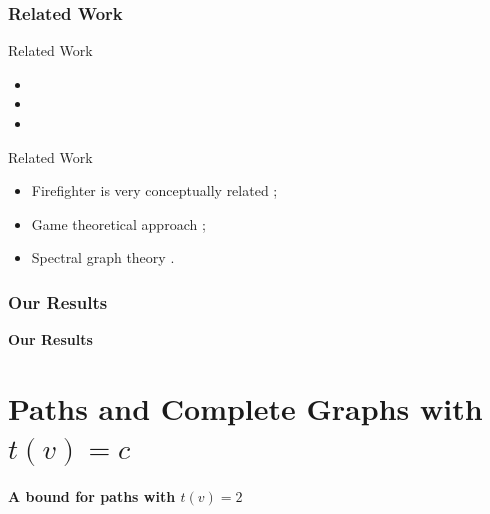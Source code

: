 \documentclass[10pt,aspectratio=169,english]{beamer}
\begin{document}
\section{Related Work}

\begin{frame}{Related Work}
	\begin{itemize}
		\item {}
		\item {}
		\item {}
	\end{itemize}
\end{frame}

\begin{frame}{Related Work}
	\begin{itemize}
		\item Firefighter is very conceptually related \parencite{Anshelevich2010};
		\item Game theoretical approach \parencite{Aspnes2006,Chen2010,Moscibroda2006,Meier2014};
		\item Spectral graph theory \parencite{Ahmad2020, Chen2016, Chakrabarti2008, Tariq2017}.
	\end{itemize}
	
\end{frame}

\section{Our Results}


\begin{frame}{}
	\textbf{\huge Our Results}
\end{frame}

\part{Paths and Complete Graphs with $t(v) = c$}


\subsection{A bound for paths with $t(v)=2$}
\end{document}
